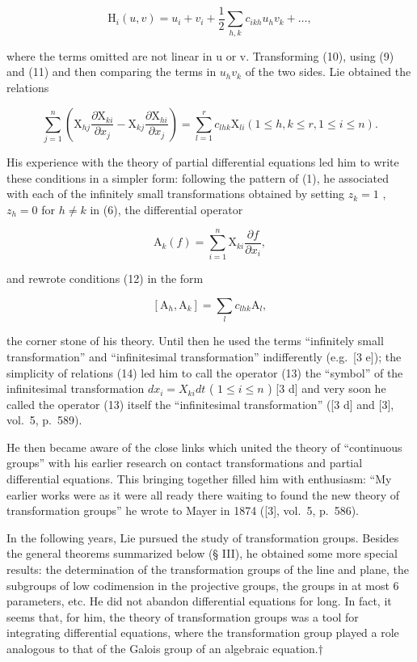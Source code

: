 \[
\mathrm{H} _ {i} (u, v) = u _ {i} + v _ {i} + \frac {1}{2} \sum_ {h, k} c _ {i k h} u _ {h} v _ {k} + \dots ,\tag{11}
\]

where the terms omitted are not linear in u or v. Transforming (10), using (9) and (11) and then comparing the terms in \(u_{h}v_{k}\) of the two sides. Lie obtained the relations

\[
\sum_ {j = 1} ^ {n} \left(\mathrm{X} _ {h j} \frac {\partial \mathrm{X} _ {k i}}{\partial x _ {j}} - \mathrm{X} _ {k j} \frac {\partial \mathrm{X} _ {h i}}{\partial x _ {j}}\right) = \sum_ {l = 1} ^ {r} c _ {l h k} \mathrm{X} _ {l i} (1 \leqslant h, k \leqslant r, 1 \leqslant i \leqslant n). \tag{12}
\]

His experience with the theory of partial differential equations led him to write these conditions in a simpler form: following the pattern of (1), he associated with each of the infinitely small transformations obtained by setting \(z_{k} = 1\) , \(z_{h} = 0\) for \(h \neq k\) in (6), the differential operator

\[
\mathrm{A} _ {k} (f) = \sum_ {i = 1} ^ {n} \mathrm{X} _ {k i} \frac {\partial f}{\partial x _ {i}},\tag{13}
\]

and rewrote conditions (12) in the form

\[
[ \mathrm{A} _ {h}, \mathrm{A} _ {k} ] = \sum_ {l} c _ {l h k} \mathrm{A} _ {l},\tag{14}
\]

the corner stone of his theory. Until then he used the terms ``infinitely small transformation'' and ``infinitesimal transformation'' indifferently (e.g.~{[}3 e{]}); the simplicity of relations (14) led him to call the operator (13) the ``symbol'' of the infinitesimal transformation \(dx_{i} = X_{ki}dt\) ( \(1 \leqslant i \leqslant n\) ) {[}3 d{]} and very soon he called the operator (13) itself the ``infinitesimal transformation'' ({[}3 d{]} and {[}3{]}, vol.~5, p.~589).

He then became aware of the close links which united the theory of ``continuous groups'' with his earlier research on contact transformations and partial differential equations. This bringing together filled him with enthusiasm: ``My earlier works were as it were all ready there waiting to found the new theory of transformation groups'' he wrote to Mayer in 1874 ({[}3{]}, vol.~5, p.~586).

In the following years, Lie pursued the study of transformation groups. Besides the general theorems summarized below (§ III), he obtained some more special results: the determination of the transformation groups of the line and plane, the subgroups of low codimension in the projective groups, the groups in at most 6 parameters, etc. He did not abandon differential equations for long. In fact, it seems that, for him, the theory of transformation groups was a tool for integrating differential equations, where the transformation group played a role analogous to that of the Galois group of an algebraic equation.†

